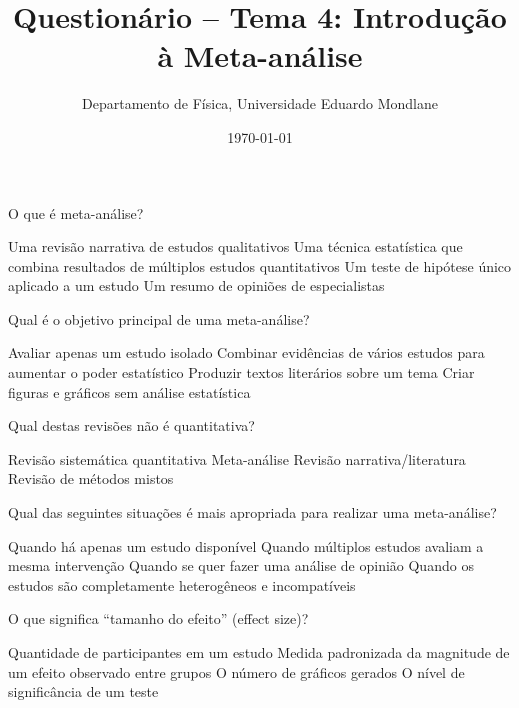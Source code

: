\documentclass[12pt,a4paper]{exam}
\title{Questionário – Tema 4: Introdução à Meta-análise}
\author{Departamento de Física, Universidade Eduardo Mondlane}
\date{\today}
\begin{document}
\maketitle

\begin{questions}

\question O que é meta-análise?  
\begin{choices}
\choice Uma revisão narrativa de estudos qualitativos
\CorrectChoice Uma técnica estatística que combina resultados de múltiplos estudos quantitativos
\choice Um teste de hipótese único aplicado a um estudo
\choice Um resumo de opiniões de especialistas
\end{choices}

\question Qual é o objetivo principal de uma meta-análise?  
\begin{choices}
\choice Avaliar apenas um estudo isolado
\CorrectChoice Combinar evidências de vários estudos para aumentar o poder estatístico
\choice Produzir textos literários sobre um tema
\choice Criar figuras e gráficos sem análise estatística
\end{choices}

\question Qual destas revisões não é quantitativa?  
\begin{choices}
\choice Revisão sistemática quantitativa
\choice Meta-análise
\CorrectChoice Revisão narrativa/literatura
\choice Revisão de métodos mistos
\end{choices}

\question Qual das seguintes situações é mais apropriada para realizar uma meta-análise?  
\begin{choices}
\choice Quando há apenas um estudo disponível
\CorrectChoice Quando múltiplos estudos avaliam a mesma intervenção
\choice Quando se quer fazer uma análise de opinião
\choice Quando os estudos são completamente heterogêneos e incompatíveis
\end{choices}

\question O que significa “tamanho do efeito” (effect size)?  
\begin{choices}
\choice Quantidade de participantes em um estudo
\CorrectChoice Medida padronizada da magnitude de um efeito observado entre grupos
\choice O número de gráficos gerados
\choice O nível de significância de um teste
\end{choices}


\end{questions}
\end{document}
